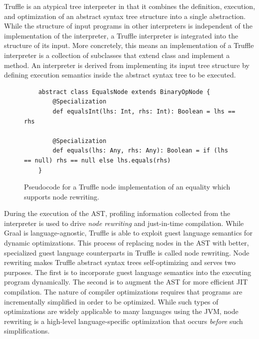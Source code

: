 Truffle is an atypical tree interpreter in that it combines the definition, execution, and optimization of an abstract syntax tree structure into a single abstraction.
While the structure of input programs in other interpreters is independent of the implementation of the interpreter, a Truffle interpreter is integrated into the structure of its input.
More concretely, this means an implementation of a Truffle interpreter is a collection of subclasses that extend  class and implement a  method.
An interpreter is derived from implementing its input tree structure by defining execution semantics inside the abstract syntax tree to be executed.

\begin{figure}[!htb]
	\begin{verbatim}
	abstract class EqualsNode extends BinaryOpNode {
		@Specialization
		def equalsInt(lhs: Int, rhs: Int): Boolean = lhs == rhs
		
		@Specialization
		def equals(lhs: Any, rhs: Any): Boolean = if (lhs == null) rhs == null else lhs.equals(rhs)
	}
	\end{verbatim}
	\caption{Pseudocode for a Truffle node implementation of an equality which supports node rewriting.}
	\label{example:node-rewriting}
\end{figure}

During the execution of the AST, profiling information collected from the interpreter is used to drive \textit{node rewriting} and just-in-time compilation.
While Graal is language-agnostic, Truffle is able to exploit guest language semantics for dynamic optimizations.
This process of replacing nodes in the AST with better, specialized guest language counterparts in Truffle is called node rewriting.
Node rewriting makes Truffle abstract syntax trees self-optimizing and serves two purposes.
The first is to incorporate guest language semantics into the executing program dynamically.
The second is to augment the AST for more efficient JIT compilation.
The nature of compiler optimizations requires that programs are incrementally simplified in order to be optimized.
While such types of optimizations are widely applicable to many languages using the JVM, node rewriting is a high-level language-specific optimization that occurs \textit{before} such simplifications.

